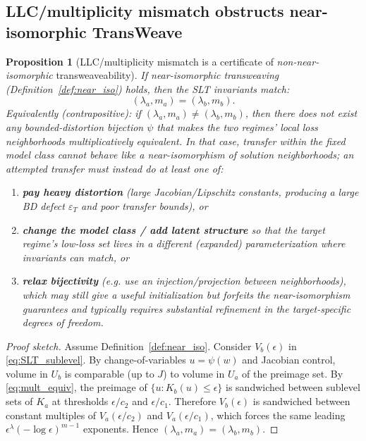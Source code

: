 \documentclass[11pt]{article}
\newtheorem{proposition}{Proposition}
\begin{document}
\subsection{LLC/multiplicity mismatch obstructs near-isomorphic TransWeave}
\begin{proposition}[LLC/multiplicity mismatch is a certificate of \emph{non-near-isomorphic} transweaveability]
\label{prop:llc_mismatch_certificate}
If near-isomorphic transweaving (Definition~\ref{def:near_iso}) holds, then the SLT invariants match:
\[
(\lambda_a,m_a) = (\lambda_b,m_b).
\]
Equivalently (contrapositive): if $(\lambda_a,m_a) \neq (\lambda_b,m_b)$, then there does \emph{not}
exist any bounded-distortion \emph{bijection} $\psi$ that makes the two regimes' local loss neighborhoods
multiplicatively equivalent. In that case, transfer within the fixed model class cannot behave like a
near-isomorphism of solution neighborhoods; an attempted transfer must instead do at least one of:
\begin{enumerate}
\item \textbf{pay heavy distortion} (large Jacobian/Lipschitz constants, producing a large BD defect
$\varepsilon_T$ and poor transfer bounds), or
\item \textbf{change the model class / add latent structure} so that the target regime's low-loss set
lives in a different (expanded) parameterization where invariants can match, or
\item \textbf{relax bijectivity} (e.g. use an injection/projection between neighborhoods), which may still give a useful
initialization but forfeits the near-isomorphism guarantees and typically requires substantial refinement in the
target-specific degrees of freedom.
\end{enumerate}
\end{proposition}

\begin{proof}[Proof sketch]
Assume Definition~\ref{def:near_iso}. Consider $V_b(\epsilon)$ in \eqref{eq:SLT_sublevel}.
By change-of-variables $u=\psi(w)$ and Jacobian control, volume in $U_b$ is comparable (up to $J$)
to volume in $U_a$ of the preimage set. By \eqref{eq:mult_equiv}, the preimage of
$\{u : K_b(u)\le \epsilon\}$ is sandwiched between sublevel sets of $K_a$ at thresholds
$\epsilon/c_2$ and $\epsilon/c_1$. Therefore $V_b(\epsilon)$ is sandwiched between constant multiples
of $V_a(\epsilon/c_2)$ and $V_a(\epsilon/c_1)$, which forces the same leading
$\epsilon^{\lambda}(-\log\epsilon)^{m-1}$ exponents. Hence $(\lambda_a,m_a)=(\lambda_b,m_b)$.
\end{proof}
\end{document}
